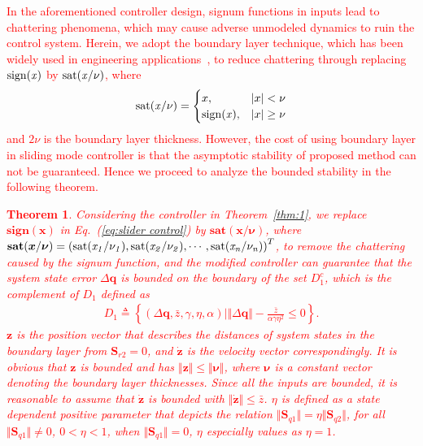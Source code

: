\documentclass[3p]{elsarticle}
\theoremstyle{plain}
\newtheorem{mythm}{Theorem}
\theoremstyle{remark}
\begin{document}
\textcolor{red}{In the aforementioned controller design, signum functions in inputs lead to chattering phenomena, which may cause adverse unmodeled dynamics to ruin the control system. Herein, we adopt the boundary layer technique, which has been widely used in engineering applications~\cite{Youndg1999A,Hwang1996sliding,In2000Robust,Chen2005,Yu2009sliding,Jin2009Practical,Al2004sliding}, to reduce chattering through replacing $\rm{sign}\it{(x)}$ by $\rm{sat}\it{(x/\nu)}$, where
\begin{align}
\rm{sat}\it{(x/\nu)}=
\begin{cases}
x,&\vert x\vert <\nu\\
\rm{sign}\it{(x)},&\vert x\vert\ge\nu
\end{cases}
\end{align}
and $2\nu$ is the boundary layer thickness. However, the cost of using boundary layer in sliding mode controller is that the asymptotic stability of proposed method can not be guaranteed. Hence we proceed to analyze the bounded stability in the following theorem.
\begin{mythm}\label{thm:boundary}
Considering the controller in Theorem~\ref{thm:1}, we replace $\mathbf{sign}{(\bm{x})}$ in Eq.~(\ref{eq:slider control}) by $\mathbf{sat}{(\boldsymbol {x/\nu})}$, where $\mathbf{sat}{(\boldsymbol{x}/\boldsymbol{\nu})}=\left(\rm{sat}\it{(x_1/\nu_1)},\rm{sat}\it{(x_2/\nu_2)},\cdots,\rm{sat}\it{(x_n/\nu_n)}\right)^T$, to remove the chattering caused by the signum function, and the modified controller can guarantee that the system state error $\Delta\bm q$ is bounded on the boundary of the set $D_1^c$, which is the complement of $D_1$ defined as
\begin{align}
  D_1\triangleq\left\{\left(\Delta\bm q,\bar z,\gamma,\eta,\alpha\right)\Big\vert\Vert\Delta\bm q\Vert-\frac{\bar z}{\alpha\gamma\eta^2}\le 0\right\}.
\end{align}
$\bm z$ is the position vector that describes the distances of system states in the boundary layer from $\bm S_{r2}=0$, and $\dot{\bm z}$ is the velocity vector correspondingly. It is obvious that $\bm z$ is bounded and has $\Vert\bm z\Vert\le\Vert\bm\nu\Vert$, where $\bm\nu$ is a constant vector denoting the boundary layer thicknesses. Since all the inputs are bounded, it is reasonable to assume that $\dot{\bm z}$ is bounded with $\Vert\dot{\bm z}\Vert\le \bar z$. $\eta$ is defined as a state dependent positive parameter that depicts the relation $\Vert\bm S_{q1}\Vert=\eta\Vert\bm S_{q2}\Vert$, for all $\Vert\bm S_{q1}\Vert\neq 0$, $0<\eta<1$, when $\Vert\bm S_{q1}\Vert= 0$, $\eta$ especially values as $\eta = 1$.

\end{mythm}}
\end{document}
